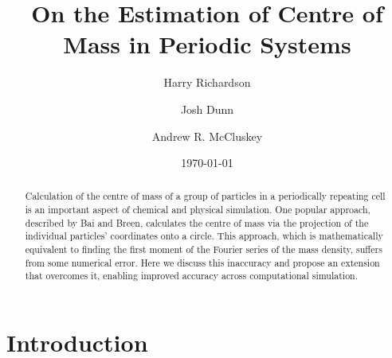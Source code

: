 \documentclass[reprint,superscriptaddress,nobibnotes,amsmath,amssymb,aip]{revtex4-2}
\newcommand{\papertitle}{On the Estimation of Centre of Mass in Periodic Systems}
\begin{document}
\let\oldaddcontentsline\addcontentsline
\renewcommand{\addcontentsline}[3]{}

\title[Accurate Centre of Mass Estimation]{\papertitle}

\author{Harry Richardson}
\author{Josh Dunn}
\author{Andrew R. McCluskey}

\date{\today}

\begin{abstract}
Calculation of the centre of mass of a group of particles in a periodically repeating cell is an important aspect of chemical and physical simulation. 
One popular approach, described by Bai and Breen, calculates the centre of mass via the projection of the individual particles' coordinates onto a circle.
This approach, which is mathematically equivalent to finding the first moment of the Fourier series of the mass density, suffers from some numerical error. 
Here we discuss this inaccuracy and propose an extension that overcomes it, enabling improved accuracy across computational simulation. 
\end{abstract}

\maketitle

\section{Introduction}
\label{sec:intro}
\end{document}
